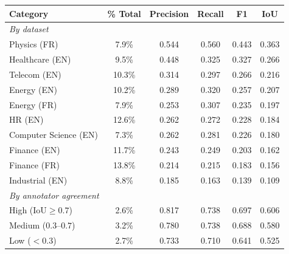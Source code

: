
\begin{table}[H]
\centering
\small
\setlength{\tabcolsep}{6pt}
\begin{tabular}{l c c c c c}
\toprule
\textbf{Category} & \textbf{\% Total} & \textbf{Precision} & \textbf{Recall} & \textbf{F1} & \textbf{IoU} \\
\midrule
\textit{By dataset} & & & & & \\
\hspace{3mm} Physics (FR) & 7.9\% & 0.544 & 0.560 & 0.443 & 0.363 \\
\hspace{3mm} Healthcare (EN) & 9.5\% & 0.448 & 0.325 & 0.327 & 0.266 \\
\hspace{3mm} Telecom (EN) & 10.3\% & 0.314 & 0.297 & 0.266 & 0.216 \\
\hspace{3mm} Energy (EN) & 10.2\% & 0.289 & 0.320 & 0.257 & 0.207 \\
\hspace{3mm} Energy (FR) & 7.9\% & 0.253 & 0.307 & 0.235 & 0.197 \\
\hspace{3mm} HR (EN) & 12.6\% & 0.262 & 0.272 & 0.228 & 0.184 \\
\hspace{3mm} Computer Science (EN) & 7.3\% & 0.262 & 0.281 & 0.226 & 0.180 \\
\hspace{3mm} Finance (EN) & 11.7\% & 0.243 & 0.249 & 0.203 & 0.162 \\
\hspace{3mm} Finance (FR) & 13.8\% & 0.214 & 0.215 & 0.183 & 0.156 \\
\hspace{3mm} Industrial (EN) & 8.8\% & 0.185 & 0.163 & 0.139 & 0.109 \\
\addlinespace
\midrule
\textit{By annotator agreement} & & & & & \\
\hspace{3mm} High ($\text{IoU} \ge 0.7$) & 2.6\% & 0.817 & 0.738 & 0.697 & 0.606 \\
\hspace{3mm} Medium ($0.3\text{--}0.7$) & 3.2\% & 0.780 & 0.738 & 0.688 & 0.580 \\
\hspace{3mm} Low ($< 0.3$) & 2.7\% & 0.733 & 0.710 & 0.641 & 0.525 \\

\end{tabular}
\end{table}
